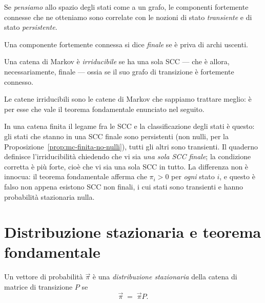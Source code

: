 Se \emph{pensiamo} allo spazio degli stati come a un grafo, le componenti fortemente
connesse che ne otteniamo sono correlate con le nozioni di stato \emph{transiente} e di
stato \emph{persistente}.

\begin{definizione}\label{def:scc-finale}
  Una componente fortemente connessa si dice \emph{finale} se è priva di archi uscenti.
\end{definizione}

\begin{definizione}\label{def:mc-irriducibile}
  Una catena di Markov è \emph{irriducibile} se ha una sola SCC --- che è allora,
  necessariamente, finale --- ossia se il suo grafo di transizione è fortemente connesso.
\end{definizione}

Le catene irriducibili sono le catene di Markov che sappiamo trattare meglio: è per esse
che vale il teorema fondamentale enunciato nel seguito.

\begin{osservazione}
  In una catena finita il legame fra le SCC e la classificazione degli stati è questo: gli
  stati che stanno in una SCC finale sono persistenti (non nulli, per la
  Proposizione~\ref{prop:mc-finita-no-nulli}), tutti gli altri sono transienti. Il quaderno
  definisce l'irriducibilità chiedendo che vi sia \emph{una sola SCC finale}; la
  condizione corretta è più forte, cioè che vi sia una sola SCC in tutto. La differenza
  non è innocua: il teorema fondamentale afferma che $\pi_i > 0$ per \emph{ogni} stato
  $i$, e questo è falso non appena esistono SCC non finali, i cui stati sono transienti e
  hanno probabilità stazionaria nulla.
\end{osservazione}


\section{Distribuzione stazionaria e teorema fondamentale}
\label{sec:mc-stazionaria}


\begin{definizione}\label{def:distribuzione-stazionaria}
  Un vettore di probabilità $\vec{\pi}$ è una \emph{distribuzione stazionaria} della catena
  di matrice di transizione $P$ se
  \[
    \vec{\pi} \;=\; \vec{\pi} P .
  \]
\end{definizione}

